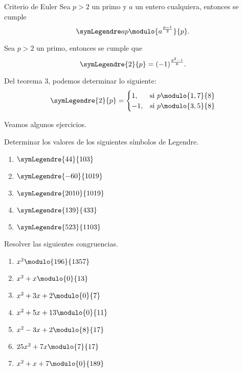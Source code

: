 \documentclass[12pt]{article}
\begin{document}
   \begin{theorem.box}{Criterio de Euler}{}
      Sea $p > 2$ un primo y $a$ un entero cualquiera, entonces se cumple
      \[
         \symLegendre a p \modulo{a^{\frac{p - 1}{2}}}{p}.
      \]
   \end{theorem.box}

   \begin{theorem.box}{}{}
      Sea $p > 2$ un primo, entonces se cumple que
      \[
         \symLegendre{2}{p} = (-1)^{\frac{p^2 - 1}{8}}.
      \]
   \end{theorem.box}

   \begin{remark.box}{}{}
      Del teorema 3, podemos determinar lo siguiente:
      \[
         \symLegendre{2}{p} =
         \begin{cases}
            1, &\text{si}\ p \modulo{1,7}{8}\\
            -1, &\text{si}\ p \modulo{3,5}{8}
         \end{cases}
      \]
   \end{remark.box}

   Veamos algunos ejercicios.
   \begin{exercise}
      Determinar los valores de los siguientes símbolos de Legendre.
      \begin{multicols}{3}
         \begin{enumerate}
            \item $\symLegendre{44}{103}$
            \item $\symLegendre{-60}{1019}$
            \item $\symLegendre{2010}{1019}$
            \item $\symLegendre{139}{433}$
            \item $\symLegendre{523}{1103}$
         \end{enumerate}
      \end{multicols}
   \end{exercise}

   \begin{exercise}
      Resolver las siguientes congruencias.
      \begin{multicols}{2}
         \begin{enumerate}
            \item $x^2 \modulo{196}{1357}$
            \item $x^2 + x \modulo{0}{13}$
            \item $x^2 + 3x + 2 \modulo{0}{7}$
            \item $x^2 + 5x + 13 \modulo{0}{11}$
            \item $x^2 - 3x + 2 \modulo{8}{17}$
            \item $25x^2 + 7x \modulo{7}{17}$
            \item $x^2 + x + 7 \modulo{0}{189}$
         \end{enumerate}
      \end{multicols}
   \end{exercise}
\end{document}
